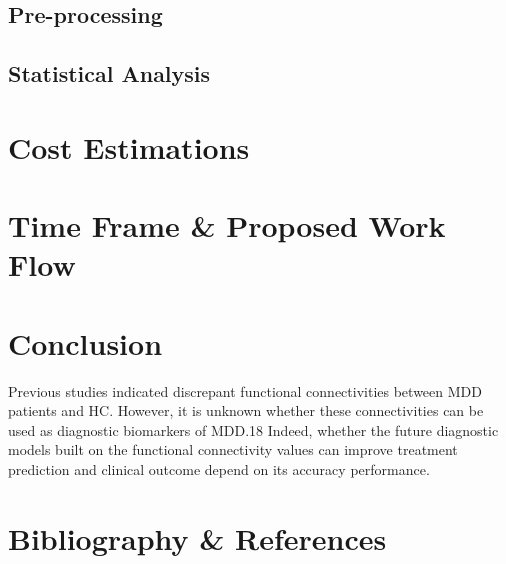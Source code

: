 \documentclass{article}
\begin{document}
\subsection{Pre-processing}
\subsection{Statistical Analysis}

\section{Cost Estimations}
\section{Time Frame \& Proposed Work Flow}
\section{Conclusion}

Previous studies indicated discrepant functional connectivities
between MDD patients and HC. However, it is unknown whether these
connectivities can be used as diagnostic biomarkers of MDD.18 Indeed,
whether the future diagnostic models built on the functional
connectivity values can improve treatment prediction and clinical
outcome depend on its accuracy performance.

\section{Bibliography \& References}
\end{document}
